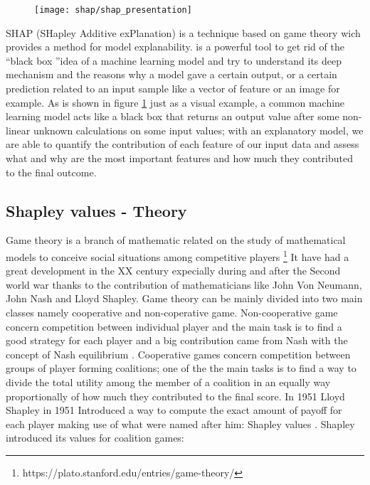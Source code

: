 \documentclass[a4paper,11pt]{article}
\begin{document}
\begin{figure}[h]
\centering
\texttt{[image: shap/shap\_presentation]}
\caption{}\label{fig:shap_waterfall}
\end{figure}


SHAP (SHapley Additive exPlanation) is a technique based on game theory wich provides a method for model explanability.
is a powerful tool to get rid of the \textquotedblleft black box \textquotedblright idea of a machine learning model and try to understand its deep mechanism and the reasons why a model gave a certain output, or a certain prediction related to an input sample like a vector of feature or an image for example.
As is shown in figure \ref{fig:shap_waterfall} just as a visual example, a common machine learning model acts like a black box that returns an output value after some non-linear unknown calculations on some input values; with an explanatory model, we are able to quantify the contribution of each feature of our input data and assess what and why are the most important features and how much they contributed to the final outcome.




\subsection{Shapley values - Theory}

Game theory is a branch of mathematic related on the study of mathematical models to  conceive social situations among competitive players \footnote{https://plato.stanford.edu/entries/game-theory/}
It have had a great development in the XX century expecially during and after the Second world war thanks to the contribution of mathematicians like John Von Neumann, John Nash and Lloyd Shapley.
Game theory can be mainly divided into two main classes namely cooperative and non-coperative game.
Non-cooperative game concern competition between individual player and the main task is to find a good strategy for each player and a big contribution came from Nash with the concept of Nash equilibrium \cite{nash-1950}.
Cooperative games concern competition between groups of player forming coalitions; one of the the main tasks is to find a way to divide the total utility among the member of a coalition in an equally way proportionally of how much they contributed to the final score.
In 1951 Lloyd Shapley in 1951 Introduced a way to compute the exact amount of payoff for each player making use of what were named after him: Shapley values \cite{shap-1951}\cite{shap-1953}.
Shapley introduced its values for coalition games:
\end{document}
